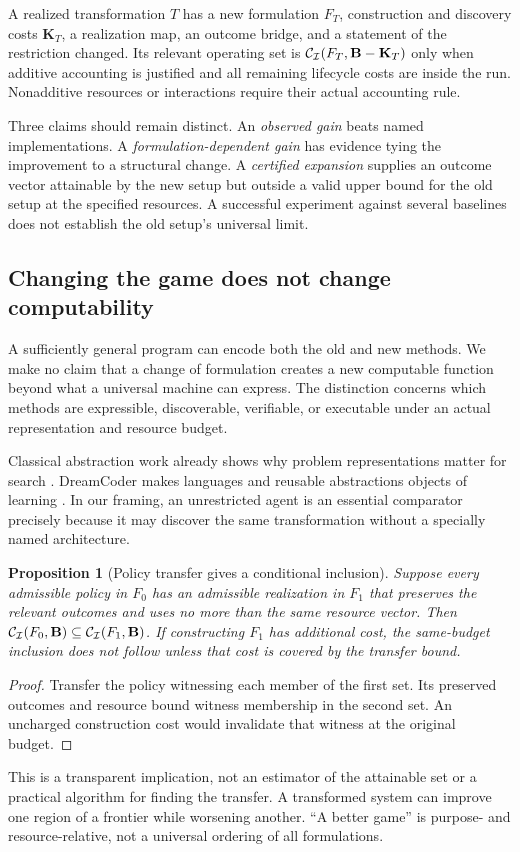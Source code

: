 \documentclass[11pt,letterpaper]{article}
\newcommand{\I}{\mathcal I}\newcommand{\A}{\mathcal A}
\newtheorem{proposition}{Proposition}[section]
\theoremstyle{remark}\newtheorem{remark}{Remark}[section]
\begin{document}
A realized transformation $T$ has a new formulation $F_T$, construction and discovery costs $\mathbf K_T$, a realization map, an outcome bridge, and a statement of the restriction changed. Its relevant operating set is $\Cset_{\I}(F_T,\mathbf B-\mathbf K_T)$ only when additive accounting is justified and all remaining lifecycle costs are inside the run. Nonadditive resources or interactions require their actual accounting rule.

Three claims should remain distinct. An \emph{observed gain} beats named implementations. A \emph{formulation-dependent gain} has evidence tying the improvement to a structural change. A \emph{certified expansion} supplies an outcome vector attainable by the new setup but outside a valid upper bound for the old setup at the specified resources. A successful experiment against several baselines does not establish the old setup's universal limit.

\subsection{Changing the game does not change computability}
A sufficiently general program can encode both the old and new methods. We make no claim that a change of formulation creates a new computable function beyond what a universal machine can express. The distinction concerns which methods are expressible, discoverable, verifiable, or executable under an actual representation and resource budget.

Classical abstraction work already shows why problem representations matter for search \citep{knoblock1994}. DreamCoder makes languages and reusable abstractions objects of learning \citep{ellis2020}. In our framing, an unrestricted agent is an essential comparator precisely because it may discover the same transformation without a specially named architecture.

\begin{proposition}[Policy transfer gives a conditional inclusion]
Suppose every admissible policy in $F_0$ has an admissible realization in $F_1$ that preserves the relevant outcomes and uses no more than the same resource vector. Then $\Cset_{\I}(F_0,\mathbf B)\subseteq\Cset_{\I}(F_1,\mathbf B)$. If constructing $F_1$ has additional cost, the same-budget inclusion does not follow unless that cost is covered by the transfer bound.
\end{proposition}
\begin{proof}
Transfer the policy witnessing each member of the first set. Its preserved outcomes and resource bound witness membership in the second set. An uncharged construction cost would invalidate that witness at the original budget.
\end{proof}
This is a transparent implication, not an estimator of the attainable set or a practical algorithm for finding the transfer. A transformed system can improve one region of a frontier while worsening another. ``A better game'' is purpose- and resource-relative, not a universal ordering of all formulations.
\end{document}
